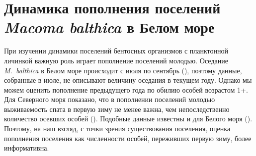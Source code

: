 		\section{Динамика пополнения поселений {\it Macoma balthica} в Белом море}
При изучении динамики поселений бентосных организмов с планктонной личинкой важную роль играет пополнение поселений молодью. 
Оседание {\it M.~balthica} в Белом море происходит с июля по сентябрь (\cite{Semenova_1980, Maximovich_1985}), поэтому данные, собранные в июле, не описывают величину оседания в текущем году. 
Однако мы можем оценить пополнение предыдущего года по обилию особей возрастом 1+. 
Для Северного моря показано, что в пополнении поселений молодью выживаемость спата в первую зиму не менее важна, чем непоследственно количество осевших особей (\cite{Beukema_et_al_1998, Strasser_Gunter_2001}). Подобные данные известны и для Белого моря (\cite{Maximovich_Gerasimova_2004}). Поэтому, на наш взгляд, с точки зрения существования поселения, оценка пополнения поселения как численности особей, переживших первую зиму, более информативна.







\par\bigskip


